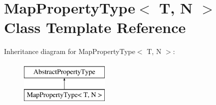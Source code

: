 \hypertarget{classMapPropertyType}{\section{Map\-Property\-Type$<$ T, N $>$ Class Template Reference}
\label{classMapPropertyType}
}
Inheritance diagram for Map\-Property\-Type$<$ T, N $>$\-:\begin{figure}[H]
\begin{center}
\leavevmode
\includegraphics[height=2.000000cm]{classMapPropertyType}
\end{center}
\end{figure}
